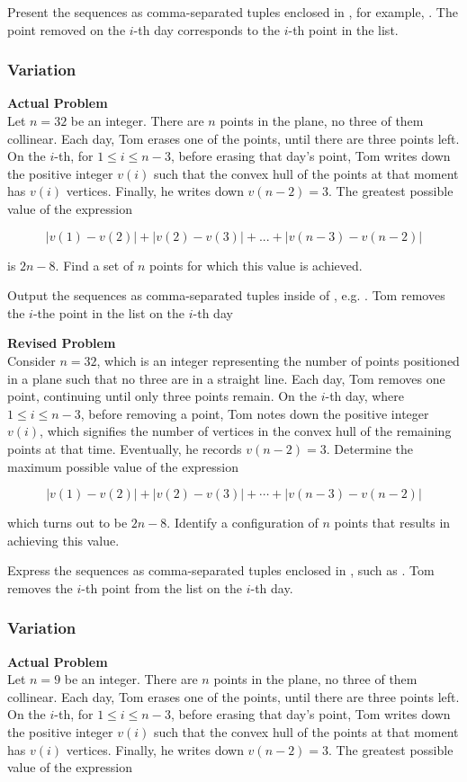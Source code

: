 Present the sequences as comma-separated tuples enclosed in \boxed, for example, . The point removed on the $i$-th day corresponds to the $i$-th point in the list.

\subsubsection{Variation}
\textbf{Actual Problem}\\
Let $n = 32$ be an integer. There are $n$ points in the plane, no three of them collinear. Each day, Tom erases one of the points, until there are three points left. On the $i$-th, for $1 \leqslant i \leqslant n -3$, before erasing that day's point, Tom writes down the positive integer $v(i)$ such that the convex hull of the points at that moment has $v(i)$ vertices. Finally, he writes down $v(n-2)=3$. The greatest possible value of the expression

$$|v(1) - v(2)| + |v(2) - v(3)| + ... + |v(n-3) - v(n-2)|$$

is $2n-8$. Find a set of $n$ points for which this value is achieved.

Output the sequences as comma-separated tuples inside of \boxed, e.g. . Tom removes the $i$-the point in the list on the $i$-th day

\textbf{Revised Problem}\\
Consider $n = 32$, which is an integer representing the number of points positioned in a plane such that no three are in a straight line. Each day, Tom removes one point, continuing until only three points remain. On the $i$-th day, where $1 \leqslant i \leqslant n - 3$, before removing a point, Tom notes down the positive integer $v(i)$, which signifies the number of vertices in the convex hull of the remaining points at that time. Eventually, he records $v(n-2)=3$. Determine the maximum possible value of the expression

$$|v(1) - v(2)| + |v(2) - v(3)| + \cdots + |v(n-3) - v(n-2)|$$

which turns out to be $2n-8$. Identify a configuration of $n$ points that results in achieving this value.

Express the sequences as comma-separated tuples enclosed in \boxed, such as . Tom removes the $i$-th point from the list on the $i$-th day.

\subsubsection{Variation}
\textbf{Actual Problem}\\
Let $n = 9$ be an integer. There are $n$ points in the plane, no three of them collinear. Each day, Tom erases one of the points, until there are three points left. On the $i$-th, for $1 \leqslant i \leqslant n -3$, before erasing that day's point, Tom writes down the positive integer $v(i)$ such that the convex hull of the points at that moment has $v(i)$ vertices. Finally, he writes down $v(n-2)=3$. The greatest possible value of the expression


